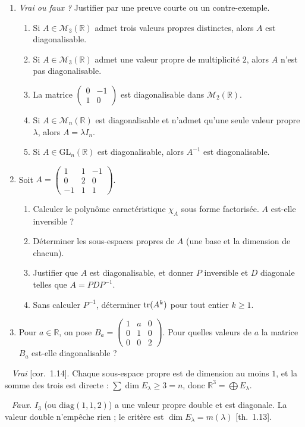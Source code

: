 \documentclass[a4paper,11pt]{article}
\newif\ifprof
\providecommand{\GLn}[1]{\mathrm{GL}_n(#1)}\providecommand{\LE}{\mathcal{L}(E)}\providecommand{\Mat}{\operatorname{Mat}}\providecommand{\Id}{\operatorname{Id}}\providecommand{\Mn}[1]{\mathcal{M}_{n}(#1)}\providecommand{\Im}{\operatorname{Im}}\renewcommand{\Im}{\operatorname{Im}}
\newcommand{\R}{\mathbb{R}}\newcommand{\C}{\mathbb{C}}\newcommand{\K}{\mathbb{K}}
\newcommand{\pmat}[1]{\begin{pmatrix}#1\end{pmatrix}}
\newcommand{\corrige}{\clearpage\noindent{\sffamily\bfseries\Large\color{Ocre}Corrigé}\par\nobreak
  \noindent{\color{Ocre}\rule{\linewidth}{0.8pt}}\par}
\newcommand{\q}[1]{\par\needspace{3\baselineskip}\smallskip{\sffamily\bfseries\color{Bleu}#1}\ }
\newcommand{\prop}[1]{{\sffamily\footnotesize\color{Gris}[#1]}}
\begin{document}
\begin{enumerate}
\item \emph{Vrai ou faux ?} Justifier par une preuve courte ou un contre-exemple.
  \begin{enumerate}
  \item Si $A\in\mathcal M_3(\R)$ admet trois valeurs propres distinctes, alors $A$ est diagonalisable.
  \item Si $A\in\mathcal M_3(\R)$ admet une valeur propre de multiplicité $2$, alors $A$ n'est pas diagonalisable.
  \item La matrice $\pmat{0&-1\\1&0}$ est diagonalisable dans $\mathcal M_2(\R)$.
  \item Si $A\in\mathcal M_n(\R)$ est diagonalisable et n'admet qu'une seule valeur propre $\lambda$, alors $A=\lambda I_n$.
  \item Si $A\in\GLn{\R}$ est diagonalisable, alors $A^{-1}$ est diagonalisable.
  \end{enumerate}
\item Soit $A=\pmat{1&1&-1\\0&2&0\\-1&1&1}$.
  \begin{enumerate}
  \item Calculer le polynôme caractéristique $\chi_A$ sous forme factorisée. $A$ est-elle inversible ?
  \item Déterminer les sous-espaces propres de $A$ (une base et la dimension de chacun).
  \item Justifier que $A$ est diagonalisable, et donner $P$ inversible et $D$ diagonale telles que $A=PDP^{-1}$.
  \item Sans calculer $P^{-1}$, déterminer $\operatorname{tr}(A^k)$ pour tout entier $k\geq1$.
  \end{enumerate}
\item Pour $a\in\R$, on pose $B_a=\pmat{1&a&0\\0&1&0\\0&0&2}$. Pour quelles valeurs de $a$ la matrice $B_a$ est-elle
      diagonalisable ?
\end{enumerate}

\ifprof
\corrige
\q{1.a)} \emph{Vrai} \prop{cor.~1.14}. Chaque sous-espace propre est de dimension au moins $1$, et la somme des trois est
directe : $\sum\dim E_\lambda\geq3=n$, donc $\R^3=\bigoplus E_\lambda$.

\q{1.b)} \emph{Faux.} $I_3$ (ou $\mathrm{diag}(1,1,2)$) a une valeur propre double et est diagonale. La valeur double n'empêche
rien ; le critère est $\dim E_\lambda=m(\lambda)$ \prop{th.~1.13}.
\end{document}
